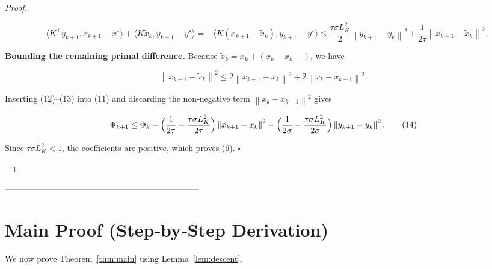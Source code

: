 \documentclass{article}
\newcommand{\norm}[1]{\left\lVert#1\right\rVert}
\begin{document}
\begin{proof}
\begin{enumerate}[label={[\arabic*]}]
\[
-\langle K^{\!\top}y_{k+1},x_{k+1}-x^{\star}\rangle
   +\langle K\tilde x_{k},y_{k+1}-y^{\star}\rangle
   =-\langle K(x_{k+1}-\tilde x_{k}),y_{k+1}-y^{\star}\rangle
   \le \frac{\tau\sigma L_{K}^{2}}{2}\norm{y_{k+1}-y_{k}}^{2}
        +\frac{1}{2\tau}\norm{x_{k+1}-\tilde x_{k}}^{2}. \tag{12}
\]

\item \textbf{Bounding the remaining primal difference.} Because $\tilde x_{k}=x_{k}+ (x_{k}-x_{k-1})$, we have  

\[
\norm{x_{k+1}-\tilde x_{k}}^{2}
\le 2\norm{x_{k+1}-x_{k}}^{2}+2\norm{x_{k}-x_{k-1}}^{2}. \tag{13}
\]

Inserting (12)–(13) into (11) and discarding the non‑negative term $\norm{x_{k}-x_{k-1}}^{2}$ gives  

\[
\Phi_{k+1}
\le \Phi_{k}
   -\Bigl(\frac{1}{2\tau}-\frac{\tau\sigma L_{K}^{2}}{2\tau}\Bigr)\norm{x_{k+1}-x_{k}}^{2}
   -\Bigl(\frac{1}{2\sigma}-\frac{\tau\sigma L_{K}^{2}}{2\sigma}\Bigr)\norm{y_{k+1}-y_{k}}^{2}.
\tag{14}
\]

Since $\tau\sigma L_{K}^{2}<1$, the coefficients are positive, which proves (6). \hfill $\square$
\end{enumerate}
\end{proof}

---------------------------------------------------------------------

\section*{Main Proof (Step‑by‑Step Derivation)}
We now prove Theorem~\ref{thm:main} using Lemma~\ref{lem:descent}.
\end{document}
